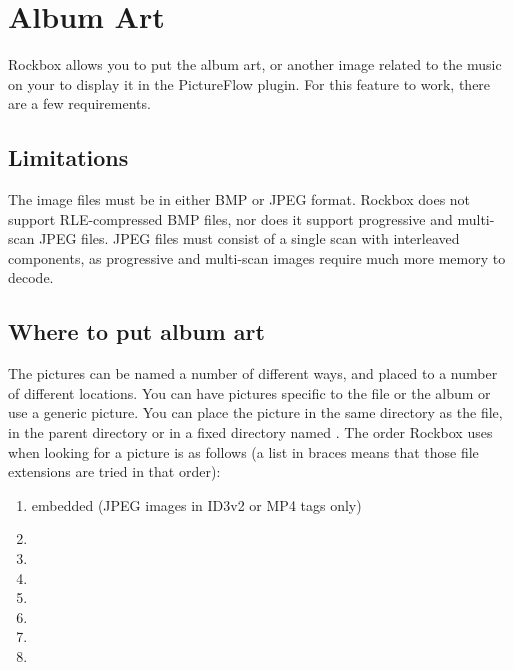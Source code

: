\chapter{\label{ref:album_art}Album Art}
Rockbox allows you to put the album art, or another image related to the music
on your \dap{} to display it in the PictureFlow plugin. For this feature to work, there are a few requirements.

\section{Limitations}

%
%
The image files must be in either BMP or JPEG format. Rockbox does not support RLE-compressed BMP files, nor does it
support progressive and multi-scan JPEG files.
JPEG files must consist of a single scan with interleaved components, 
as progressive and multi-scan images require much more memory to decode.

\section{Where to put album art}

The pictures can be named a number of different ways, and placed to a number of
different locations. You can have pictures specific to the file or the album
or use a generic picture. You can place the picture in the same directory
as the file, in the parent directory or in a fixed directory named
. The order Rockbox uses when looking for a picture
is as follows (a list in braces means that those file extensions are tried in
that order):

\begin{enumerate}
\item  embedded (JPEG images in ID3v2 or MP4 tags only)
\item  {}
\item  {}
\item  {}
\item  {}
\item  {}
\item  {}
\item  {}
\end{enumerate}

